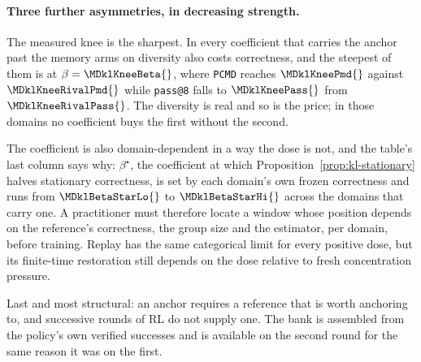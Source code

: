\documentclass{article}
\newcommand{\1}{\mathbf 1}
\newcommand{\pmd}{\texttt{PCMD}}
\theoremstyle{remark}
\theoremstyle{definition}
\theoremstyle{plain}
\begin{document}
\paragraph{Three further asymmetries, in decreasing strength.}
The measured knee is the sharpest. In \MDklPricedNames{} every coefficient
that carries the anchor past the memory arms on diversity also costs correctness,
and the steepest of them is \MDklKneeDomain{} at $\beta=\MDklKneeBeta{}$, where
\pmd{} reaches $\MDklKneePmd{}$ against $\MDklKneeRivalPmd{}$ while
\texttt{pass@8} falls to $\MDklKneePass{}$ from $\MDklKneeRivalPass{}$. The
diversity is real and so is the price; in those domains no coefficient buys the
first without the second.

The coefficient is also domain-dependent in a way the dose is not, and the
table's last column says why: $\beta^\star$, the coefficient at which
Proposition~\ref{prop:kl-stationary} halves stationary correctness, is set by
each domain's own frozen correctness and runs from $\MDklBetaStarLo{}$ to
$\MDklBetaStarHi{}$ across the domains that carry one. A practitioner must therefore locate a window whose position
depends on the reference's correctness, the group size and the estimator, per
domain, before training. Replay has the same categorical limit for every positive dose, but its
finite-time restoration still depends on the dose relative to fresh
concentration pressure.

Last and most structural: an anchor requires a reference that is worth
anchoring to, and successive rounds of RL do not supply one. The bank is
assembled from the policy's own verified successes and is available on the
second round for the same reason it was on the first.
\end{document}
